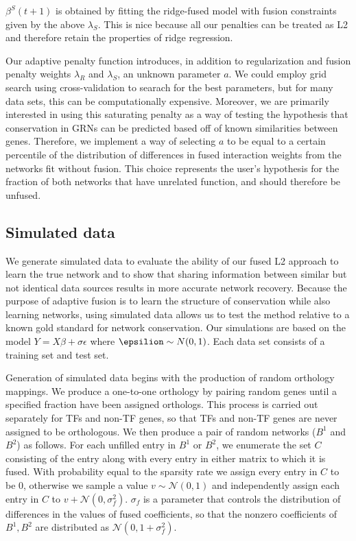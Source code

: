 \documentclass[11pt]{article}
\begin{document}
$\beta^S(t+1)$ is obtained by fitting the ridge-fused model with fusion constraints given by the above $\lambda_S$. This is nice because all our penalties can be treated as L2 and therefore retain the properties of ridge regression. 

Our adaptive penalty function introduces, in addition to regularization and fusion penalty weights $\lambda_R$ and $\lambda_S$, an unknown parameter $a$. We could employ grid search using cross-validation to searach for the best parameters, but for many data sets, this can be computationally expensive. Moreover, we are primarily interested in using this saturating penalty as a way of testing the hypothesis that conservation in GRNs can be predicted based off of known similarities between genes. Therefore, we implement a way of selecting $a$ to be equal to a certain percentile of the distribution of differences in fused interaction weights from the networks fit without fusion. This choice represents the user's hypothesis for the fraction of both networks that have unrelated function, and should therefore be unfused. 



\subsection{Simulated data}
We generate simulated data to evaluate the ability of our fused L2 approach to learn the true network and to show that sharing information between similar but not identical data sources results in more accurate network recovery. Because the purpose of adaptive fusion is to learn the structure of conservation while also learning networks, using simulated data allows us to test the method relative to a known gold standard for network conservation. 
Our simulations are based on the model $Y=X\beta+\sigma \epsilon$ where $\epsilion \sim N(0,1)$. Each data set consists of a training set and test set. 

Generation of simulated data begins with the production of random orthology mappings. We produce a one-to-one orthology by pairing random genes until a specified fraction have been assigned orthologs. This process is carried out separately for TFs and non-TF genes, so that TFs and non-TF genes are never assigned to be orthologous. We then produce a pair of random networks ($B^1$ and $B^2$) as follows. For each unfilled entry in $B^1$ or $B^2$, we enumerate the set $C$ consisting of the entry along with every entry in either matrix to which it is fused. With probability equal to the sparsity rate we assign every entry in $C$ to be 0, otherwise we sample a value $v \sim \mathcal{N}(0,1)$ and independently assign each entry in $C$ to $v + \mathcal{N}(0, \sigma_f^2)$. $\sigma_f$ is a parameter that controls the distribution of differences in the values of fused coefficients, so that the nonzero coefficients of $B^1, B^2$ are distributed as $\mathcal{N}(0, 1 + \sigma_f^2)$.
\end{document}
